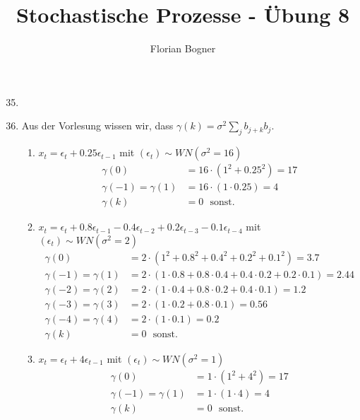 \documentclass[a4paper,11pt,notitlepage,fullpage]{article}
\begin{document}
\author{Florian Bogner}
\title{Stochastische Prozesse - Übung 8}
\maketitle

\begin{enumerate}
\setcounter{enumi}{34}

\item 

\item Aus der Vorlesung wissen wir, dass $\gamma(k) = \sigma^2 \sum_j b_{j+k}b_j$.
\begin{enumerate}
\item $x_t = \epsilon_t + 0.25 \epsilon_{t-1}$ mit $(\epsilon_t) \sim WN(\sigma^2 = 16)$
\begin{align*}
\gamma(0) &= 16 \cdot (1^2 + 0.25^2) = 17 \\
\gamma(-1) = \gamma(1) &= 16 \cdot (1 \cdot 0.25) = 4 \\
\gamma(k) &= 0~~~\text{sonst.}
\end{align*}

\item $x_t = \epsilon_t + 0.8 \epsilon_{t-1} - 0.4 \epsilon_{t-2} + 0.2 \epsilon_{t-3} - 0.1 \epsilon_{t-4}$ mit $(\epsilon_t) \sim WN(\sigma^2 = 2)$
\begin{align*}
\gamma(0) &= 2 \cdot (1^2 + 0.8^2 + 0.4^2 + 0.2^2 + 0.1^2) = 3.7 \\
\gamma(-1) = \gamma(1) &= 2 \cdot (1 \cdot 0.8+ 0.8 \cdot 0.4 + 0.4 \cdot 0.2 + 0.2 \cdot 0.1) = 2.44 \\
\gamma(-2) = \gamma(2) &= 2 \cdot (1 \cdot 0.4+ 0.8 \cdot 0.2 + 0.4 \cdot 0.1) = 1.2 \\
\gamma(-3) = \gamma(3) &= 2 \cdot (1 \cdot 0.2+ 0.8 \cdot 0.1) = 0.56 \\
\gamma(-4) = \gamma(4) &= 2 \cdot (1 \cdot 0.1) = 0.2 \\
\gamma(k) &= 0~~~\text{sonst.}
\end{align*}

\item $x_t = \epsilon_t + 4 \epsilon_{t-1}$ mit $(\epsilon_t) \sim WN(\sigma^2 = 1)$
\begin{align*}
\gamma(0) &= 1 \cdot (1^2 + 4^2) = 17 \\
\gamma(-1) = \gamma(1) &= 1 \cdot (1 \cdot 4) = 4 \\
\gamma(k) &= 0~~~\text{sonst.}
\end{align*}
\end{enumerate}


\end{enumerate}
\end{document}
